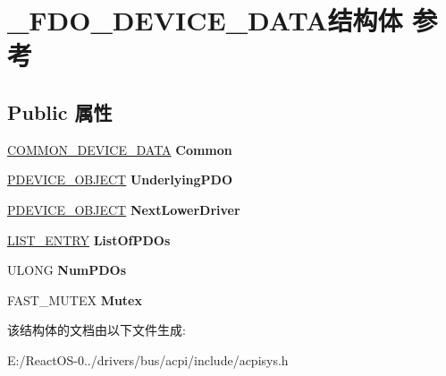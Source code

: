 \hypertarget{struct___f_d_o___d_e_v_i_c_e___d_a_t_a}{}\section{\+\_\+\+F\+D\+O\+\_\+\+D\+E\+V\+I\+C\+E\+\_\+\+D\+A\+T\+A结构体 参考}
\label{struct___f_d_o___d_e_v_i_c_e___d_a_t_a}
\subsection*{Public 属性}
\begin{DoxyCompactItemize}
\item 
\mbox{\label{struct___f_d_o___d_e_v_i_c_e___d_a_t_a_a301e7558eaa22fabbcfc76903913dace}} 
\hyperlink{struct___c_o_m_m_o_n___d_e_v_i_c_e___d_a_t_a}{C\+O\+M\+M\+O\+N\+\_\+\+D\+E\+V\+I\+C\+E\+\_\+\+D\+A\+TA} {\bfseries Common}
\item 
\mbox{\label{struct___f_d_o___d_e_v_i_c_e___d_a_t_a_adc2a11dae3f670ed6e447a753b40801e}} 
\hyperlink{struct___d_e_v_i_c_e___o_b_j_e_c_t}{P\+D\+E\+V\+I\+C\+E\+\_\+\+O\+B\+J\+E\+CT} {\bfseries Underlying\+P\+DO}
\item 
\mbox{\label{struct___f_d_o___d_e_v_i_c_e___d_a_t_a_a9118ac9e03a493ff284ada4509b137a8}} 
\hyperlink{struct___d_e_v_i_c_e___o_b_j_e_c_t}{P\+D\+E\+V\+I\+C\+E\+\_\+\+O\+B\+J\+E\+CT} {\bfseries Next\+Lower\+Driver}
\item 
\mbox{\label{struct___f_d_o___d_e_v_i_c_e___d_a_t_a_ad2af11e90b7f253791e4a2d14bea8982}} 
\hyperlink{struct___l_i_s_t___e_n_t_r_y}{L\+I\+S\+T\+\_\+\+E\+N\+T\+RY} {\bfseries List\+Of\+P\+D\+Os}
\item 
\mbox{\label{struct___f_d_o___d_e_v_i_c_e___d_a_t_a_ae91da7ffafe0e03478c875c8124e823c}} 
U\+L\+O\+NG {\bfseries Num\+P\+D\+Os}
\item 
\mbox{\label{struct___f_d_o___d_e_v_i_c_e___d_a_t_a_a36a036bfcb278558b0f79725bc5aef0a}} 
F\+A\+S\+T\+\_\+\+M\+U\+T\+EX {\bfseries Mutex}
\end{DoxyCompactItemize}


该结构体的文档由以下文件生成\+:\begin{DoxyCompactItemize}
\item 
E\+:/\+React\+O\+S-\/0../drivers/bus/acpi/include/acpisys.\+h\end{DoxyCompactItemize}
